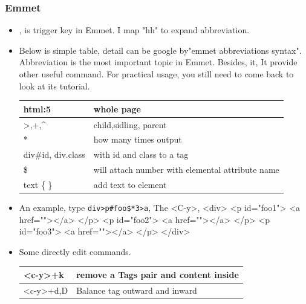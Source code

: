 \documentclass[paper=8.5in:11in, twoside, 12pt, pagesize=pdftex]{book}
\begin{document}
				\subsubsection{Emmet}
				\begin{itemize}
					\item <C-y>, is trigger key in Emmet. I map "hh" to expand abbreviation.
					
					\item Below is simple table, detail can be google by"emmet abbreviations syntax". Abbreviation is the most important topic in Emmet. Besides, it, It provide other useful command.  For practical usage, you still need to come back to look at its tutorial. \\
					
					\begin{tabular}{p{}|p{}}
						\hline 
						html:5  & whole page \\ 
						\hline 
						>,+,\^{} & child,sidling, parent  \\ 
						\hline 
						* &how many times output \\
						\hline
						div\#id, div.class & with id and class to a tag \\
						
						\hline 
						\$ & will attach number with elemental attribute name   \\
						
						\hline
						text \{ \} & add text to element \\
						\hline
					\end{tabular}
					
					\item An example, type \verb=div>p#foo$*3>a=, The <C-y>, 
					<div>
					<p id="foo1">
					<a href=""></a>
					</p>
					<p id="foo2">
					<a href=""></a>
					</p>
					<p id="foo3">
					<a href=""></a>
					</p>
					</div>
					
					\item Some directly edit commands. \\
					
					\begin{tabular}{p{}|p{}}
						\hline 
						<c-y>+k  & remove a Tags pair and content inside \\
						
						\hline 
						<c-y>+d,D & Balance tag outward and inward  \\
						

\end{tabular}
\end{itemize}
\end{document}
